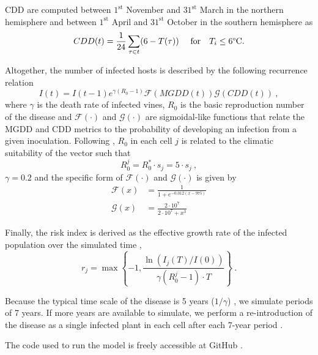 CDD are computed between $1^{\mathrm{st}}$ November and $31^{\mathrm{st}}$
March in the northern hemisphere and between $1^{\mathrm{st}}$ April and
$31^{\mathrm{st}}$ October in the southern hemisphere as
\begin{equation}
    CDD(t)= \frac{1}{24}\sum_{\tau \in t} (6-T(\tau)) \ \quad \textrm{for}
    \quad T_i\le 6\textrm{\textdegree C} .	\label{eq:CDDdef}
\end{equation}

Altogether, the number of infected hosts is described by the following
recurrence relation
\begin{equation}
    I(t)=I(t-1)e^{\gamma(R_0-1)}\mathcal{F}(MGDD(t))\mathcal{G}(CDD(t)) \ ,
\end{equation}
where $\gamma$ is the death rate of infected vines, $R_0$ is the basic
reproduction number of the disease and $\mathcal{F}(\cdot)$ and
$\mathcal{G}(\cdot)$ are sigmoidal-like functions that relate the MGDD and CDD
metrics to the probability of developing an infection from a given inoculation.
Following \cite{GimenezRomero2022_CommsBio}, $R_0$ in each cell $j$ is related
to the
climatic suitability of the vector such that
\begin{equation}
    R_0^j=R_0^*\cdot s_j=5\cdot s_j \ ,
\end{equation}
$\gamma=0.2$ and the specific form of $\mathcal{F}(\cdot)$ and
$\mathcal{G}(\cdot)$ is given by
\begin{align}
    \mathcal{F}(x) & = \frac{1}{1+e^{-0.012(x-975)}}        \\
    \mathcal{G}(x) & = \frac{2\cdot10^7}{2\cdot 10^7 + x^3}
\end{align}

Finally, the risk index is derived as the effective growth rate of the
infected population over the simulated time \cite{GimenezRomero2022_CommsBio},
\begin{equation}
    r_j=\max\left\{-1, \frac{\ln(I_j(T) / I(0))}{\gamma(R_0^j-1)\cdot
        T}\right\} \ .
\end{equation}

Because the typical time scale of the disease is 5 years ($1/\gamma$)
\cite{Almeida2003}, we simulate periods of 7 years. If more years are available
to simulate, we perform a re-introduction of the disease as a single infected
plant in each cell after each 7-year period
\cite{GimenezRomero2022_CommsBio}.

The code used to run the model is freely accessible at GitHub
\cite{CODE_model}.

